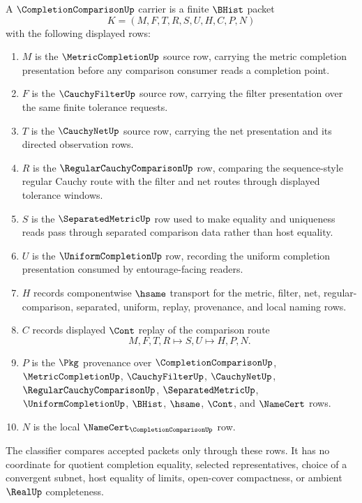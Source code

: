 \begin{definition}
\label{def:completion-comparison-carrier}
A $\CompletionComparisonUp$ carrier is a finite $\BHist$ packet
$$
K=(M,F,T,R,S,U,H,C,P,N)
$$
with the following displayed rows:
\begin{enumerate}
\item $M$ is the $\MetricCompletionUp$ source row, carrying the metric completion presentation before any comparison consumer reads a completion point.
\item $F$ is the $\CauchyFilterUp$ source row, carrying the filter presentation over the same finite tolerance requests.
\item $T$ is the $\CauchyNetUp$ source row, carrying the net presentation and its directed observation rows.
\item $R$ is the $\RegularCauchyComparisonUp$ row, comparing the sequence-style regular Cauchy route with the filter and net routes through displayed tolerance windows.
\item $S$ is the $\SeparatedMetricUp$ row used to make equality and uniqueness reads pass through separated comparison data rather than host equality.
\item $U$ is the $\UniformCompletionUp$ row, recording the uniform completion presentation consumed by entourage-facing readers.
\item $H$ records componentwise $\hsame$ transport for the metric, filter, net, regular-comparison, separated, uniform, replay, provenance, and local naming rows.
\item $C$ records displayed $\Cont$ replay of the comparison route
$$
M,F,T,R \longmapsto S,U \longmapsto H,P,N .
$$
\item $P$ is the $\Pkg$ provenance over $\CompletionComparisonUp$, $\MetricCompletionUp$, $\CauchyFilterUp$, $\CauchyNetUp$, $\RegularCauchyComparisonUp$, $\SeparatedMetricUp$, $\UniformCompletionUp$, $\BHist$, $\hsame$, $\Cont$, and $\NameCert$ rows.
\item $N$ is the local $\NameCert_{\CompletionComparisonUp}$ row.
\end{enumerate}
The classifier compares accepted packets only through these rows. It has no coordinate for quotient completion equality, selected representatives, choice of a convergent subnet, host equality of limits, open-cover compactness, or ambient $\RealUp$ completeness.
\end{definition}

